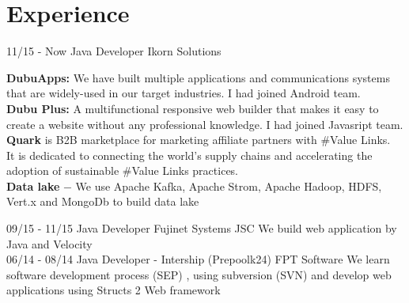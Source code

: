 \documentclass[]{friggeri-cv}
\begin{document}
\section{Experience}
\begin{entrylist}
  \entry
    {11/15 - Now}
    {Java Developer}
    {Ikorn Solutions}
    {\textbf{DubuApps: }We have built multiple applications and communications systems that are widely-used in our target industries. I had joined Android team.\\ 
     \textbf{Dubu Plus: } A multifunctional responsive web builder that makes it easy to create a website without any professional knowledge. I had joined Javasript team.
   \\ \textbf{Quark}  is B2B marketplace for marketing affiliate partners with \#Value Links.\\ It is dedicated to connecting the world’s supply chains and accelerating the adoption of sustainable \#Value Links practices.
\\ \textbf{Data lake} $-$ We use Apache Kafka, Apache Strom, Apache Hadoop, HDFS, Vert.x and MongoDb to build data lake
	
}
  \entry
    {09/15 - 11/15}
    {Java Developer}
    {Fujinet Systems JSC}
    {We build web application by Java and Velocity\\}
    \entry
    {06/14 - 08/14}
    {Java Developer - Intership (Prepoolk24)}
    {FPT Software}
    {We learn software development process (SEP) , using subversion (SVN) and develop web applications using Structs 2 Web framework\\}
\end{entrylist}
\end{document}

